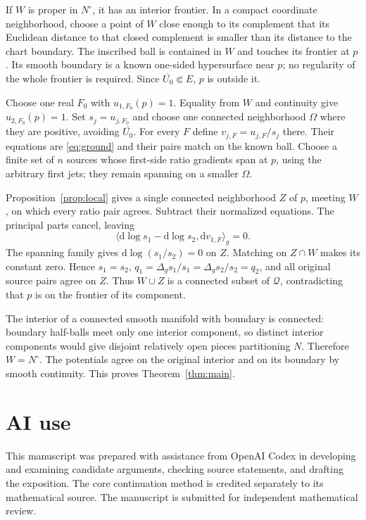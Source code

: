 \documentclass[11pt]{article}
\theoremstyle{definition}\newtheorem{definition}[theorem]{Definition}
\theoremstyle{remark}\newtheorem{remark}[theorem]{Remark}
\newcommand{\dd}{\mathrm d}
\newcommand{\ip}[2]{\langle #1,#2\rangle}
\begin{document}
If $W$ is proper in $N^\circ$, it has an interior frontier.
In a compact coordinate neighborhood, choose a point of $W$ close enough
to its complement that its Euclidean distance to that closed complement
is smaller than its distance to the chart boundary. The inscribed ball
is contained in $W$ and touches its frontier at $p$. Its smooth boundary
is a known one-sided hypersurface near $p$; no regularity of the whole
frontier is required. Since $\overline{U_0}\Subset E$, $p$ is outside it.

Choose one real $F_0$ with $u_{1,F_0}(p)=1$. Equality from $W$ and
continuity give $u_{2,F_0}(p)=1$. Set $s_j=u_{j,F_0}$ and choose one
connected neighborhood $\Omega$ where they are positive, avoiding
$\overline{U_0}$. For every $F$ define $v_{j,F}=u_{j,F}/s_j$ there.
Their equations are \eqref{eq:ground} and their pairs match on the known
ball. Choose a finite set of $n$ sources whose first-side ratio gradients
span at $p$, using the arbitrary first jets; they remain spanning on a
smaller $\Omega$.

Proposition~\ref{prop:local} gives a single connected neighborhood $Z$
of $p$, meeting $W$, on which every ratio pair agrees. Subtract their
normalized equations. The principal parts cancel, leaving
\[
 \ip{\dd\log s_1-\dd\log s_2}{\dd v_{1,F}}_g=0.
\]
The spanning family gives $\dd\log(s_1/s_2)=0$ on $Z$.
Matching on $Z\cap W$ makes its constant zero. Hence $s_1=s_2$,
$q_1=\Delta_gs_1/s_1=\Delta_gs_2/s_2=q_2$, and all original source pairs
agree on $Z$. Thus $W\cup Z$ is a connected subset of $\mathcal Q$,
contradicting that $p$ is on the frontier of its component.

The interior of a connected smooth manifold with boundary is connected:
boundary half-balls meet only one interior component, so distinct interior
components would give disjoint relatively open pieces partitioning $N$.
Therefore $W=N^\circ$. The potentials agree on the original interior and
on its boundary by smooth continuity. This proves Theorem~\ref{thm:main}.

\section*{AI use}
This manuscript was prepared with assistance from OpenAI Codex in developing
and examining candidate arguments, checking source statements, and drafting
the exposition. The core continuation method is credited separately to its
mathematical source. The manuscript is submitted for independent mathematical
review.
\end{document}
